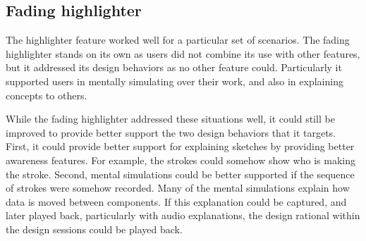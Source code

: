 \documentclass[12pt,fleqn]{ucithesis}
\begin{document}
%

\subsection{Fading highlighter}


The highlighter feature worked well for a particular set of scenarios. The fading highlighter stands on its own as users did not combine its use with other features, but it addressed its design behaviors as no other feature could. Particularly it supported users in mentally simulating over their work, and also in explaining concepts to others. 

While the fading highlighter addressed these situations well, it could still be improved to provide better support the two design behaviors that it targets. First, it could provide better support for explaining sketches by providing better awareness features. For example, the strokes could somehow show who is making the stroke. Second, mental simulations could be better supported if the sequence of strokes were somehow recorded. Many of the mental simulations explain how data is moved between components. If this explanation could be captured, and later played back, particularly with audio explanations, the design rational within the design sessions could be played back.
\end{document}
